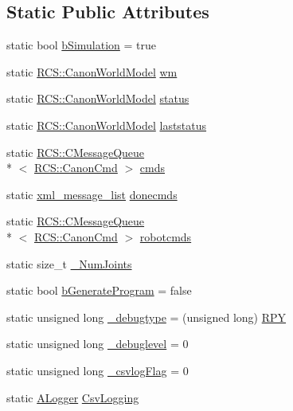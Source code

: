 \subsection*{Static Public Attributes}
\begin{DoxyCompactItemize}
\item 
static bool \hyperlink{structRCS_1_1CController_a5cc727cd1f880d16be6f34d501e06ef0}{b\-Simulation} = true
\item 
static \hyperlink{structRCS_1_1CanonWorldModel}{R\-C\-S\-::\-Canon\-World\-Model} \hyperlink{structRCS_1_1CController_a2b5d355e3e9d6195943ab148c1f94083}{wm}
\item 
static \hyperlink{structRCS_1_1CanonWorldModel}{R\-C\-S\-::\-Canon\-World\-Model} \hyperlink{structRCS_1_1CController_a82e9cc233cd25554964efe8a9008e0b2}{status}
\item 
static \hyperlink{structRCS_1_1CanonWorldModel}{R\-C\-S\-::\-Canon\-World\-Model} \hyperlink{structRCS_1_1CController_af76ac9412dbefbaebc970d62f88a40fa}{laststatus}
\item 
static \hyperlink{classRCS_1_1CMessageQueue}{R\-C\-S\-::\-C\-Message\-Queue}\\*
$<$ \hyperlink{structRCS_1_1CanonCmd}{R\-C\-S\-::\-Canon\-Cmd} $>$ \hyperlink{structRCS_1_1CController_adceba05ebd7fa94f93c131db84840d29}{cmds}
\item 
static \hyperlink{structRCS_1_1CController_aeaee07d36d39b56ecad1ce2443b5b4c0}{xml\-\_\-message\-\_\-list} \hyperlink{structRCS_1_1CController_a093ccebe77526dc736b0ddff70dec0fc}{donecmds}
\item 
static \hyperlink{classRCS_1_1CMessageQueue}{R\-C\-S\-::\-C\-Message\-Queue}\\*
$<$ \hyperlink{structRCS_1_1CanonCmd}{R\-C\-S\-::\-Canon\-Cmd} $>$ \hyperlink{structRCS_1_1CController_aa96c7961737b7e1cf5d8b4180f4bc399}{robotcmds}
\item 
static size\-\_\-t \hyperlink{structRCS_1_1CController_a9b155c29a4fbb8b1a36dada1417126ff}{\-\_\-\-Num\-Joints}
\item 
static bool \hyperlink{structRCS_1_1CController_a5b5e83348fbf18e362a59a2d96668466}{b\-Generate\-Program} = false
\item 
static unsigned long \hyperlink{structRCS_1_1CController_ae4ff5cead0f30ebf8dcbc850b342afc4}{\-\_\-debugtype} = (unsigned long) \hyperlink{structRCS_1_1CController_ae1f342838100497b0b94108c6ec74915aa62b453d8d0e2b7bf2f8a22b9b650441}{R\-P\-Y}
\item 
static unsigned long \hyperlink{structRCS_1_1CController_a1e7f92c361c961fae03b08986bc19a16}{\-\_\-debuglevel} = 0
\item 
static unsigned long \hyperlink{structRCS_1_1CController_ab52a91aa3bfa1f56b527217f09c66912}{\-\_\-csvlog\-Flag} = 0
\item 
static \hyperlink{classALogger}{A\-Logger} \hyperlink{structRCS_1_1CController_a7e21b1156fe37407bae1ba468815206c}{Csv\-Logging}
\end{DoxyCompactItemize}
